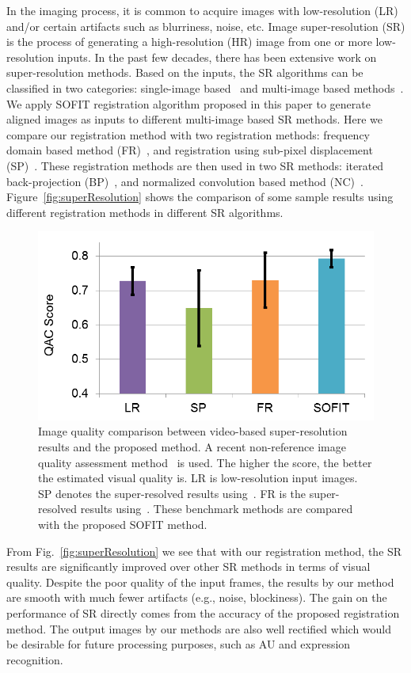 \documentclass[10pt,journal]{IEEEtran}
\begin{document}
In the imaging process, it is common to acquire images with low-resolution (LR) and/or certain artifacts such as blurriness, noise, etc. Image super-resolution (SR) is the process of generating a high-resolution (HR) image from one or more low-resolution inputs. In the past few decades, there has been extensive work on super-resolution methods. Based on the inputs, the SR algorithms can be classified in two categories: single-image based~\cite{Sun_CVPR08} and multi-image based methods~\cite{Irani91}. We apply SOFIT registration algorithm proposed in this paper to generate aligned images as inputs to different multi-image based SR methods. Here we compare our registration method with two registration methods: frequency domain based method (FR)~\cite{Vandewalle06}, and registration using sub-pixel displacement (SP)~\cite{Keren_CVPR88}. These registration methods are then used in two SR methods: iterated back-projection (BP)~\cite{Irani91}, and normalized convolution based method (NC)~\cite{Pham_06}. Figure~\ref{fig:superResolution} shows the comparison of some sample results using different registration methods in different SR algorithms.

\begin{figure}[htbp]
	\centering
		\includegraphics[width=.8\columnwidth]{fig/SR_quant.png}
	\caption{Image quality comparison between video-based super-resolution results and the proposed method. A recent non-reference image quality assessment method~\cite{Xue_CVPR13} is used. The higher the score, the better the estimated visual quality is. LR is low-resolution input images. SP denotes the super-resolved results using~\cite{Keren_CVPR88}. FR is the super-resolved results using~\cite{Vandewalle06}. These benchmark methods are compared with the proposed SOFIT method.}
	\label{fig:SR_quant}
\end{figure}

From Fig.~\ref{fig:superResolution} we see that with our registration method, the SR results are significantly improved over other SR methods in terms of visual quality. Despite the poor quality of the input frames, the results by our method are smooth with much fewer artifacts (e.g., noise, blockiness). The gain on the performance of SR directly comes from the accuracy of the proposed registration method. The output images by our methods are also well rectified which would be desirable for future processing purposes, such as AU and expression recognition. 
\end{document}
